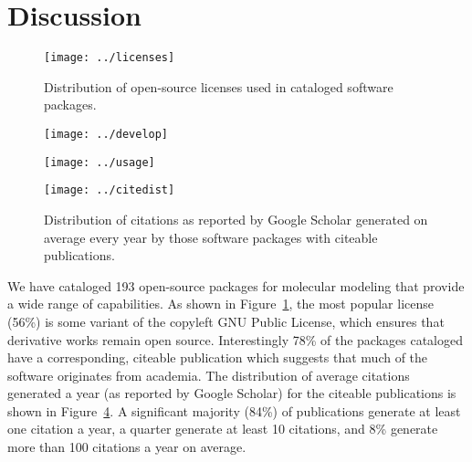 \section{Discussion}

\begin{figure}
\centering 
\texttt{[image: ../licenses]}
\caption{\label{licenses} Distribution of open-source licenses used in cataloged software packages.}
\end{figure}

\begin{figure*}
\centering
\begin{subfigure}[t]{.4\linewidth}
\centering 
\texttt{[image: ../develop]}
\caption{\label{develop}}
\end{subfigure}
\hfill
\begin{subfigure}[t]{.4\linewidth}
\centering 
\texttt{[image: ../usage]}
\caption{\label{usage}}
\end{subfigure}
\caption{\label{pies} Activity distributions of cataloged software packages.
() Distribution of development activity. () Distribution of user activity.
}
\end{figure*}

\begin{figure}
\centering 
\texttt{[image: ../citedist]}
\caption{\label{cites} Distribution of citations as reported by Google Scholar generated on average every year by those software packages with citeable publications.}
\end{figure}


We have cataloged 193 open-source packages for molecular modeling that provide a wide range of capabilities.  As shown in Figure~\ref{licenses}, the most popular license (56\%) is some variant of the copyleft GNU Public License, which ensures that derivative works remain open source.  Interestingly 78\% of the packages cataloged have a corresponding, citeable publication which suggests that much of the software originates from academia.   The distribution of average citations generated a year (as reported by Google Scholar) for the citeable publications is shown in Figure~\ref{cites}.  A significant majority (84\%) of publications generate at least one citation a year, a quarter generate at least 10 citations, and 8\% generate more than 100 citations a year on average.

